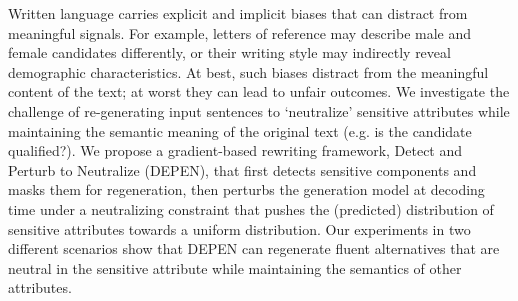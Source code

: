 Written language carries explicit and implicit biases that can distract from meaningful signals. For example, letters of reference may describe male and female candidates differently, or their writing style may indirectly reveal demographic characteristics. At best, such biases distract from the meaningful content of the text; at worst they can lead to unfair outcomes. We investigate the challenge of re-generating input sentences to ‘neutralize' sensitive attributes while maintaining the semantic meaning of the original text (e.g. is the candidate qualified?). We propose a gradient-based rewriting framework, Detect and Perturb to Neutralize (DEPEN), that first detects sensitive components and masks them for regeneration, then perturbs the generation model at decoding time under a neutralizing constraint that pushes the (predicted) distribution of sensitive attributes towards a uniform distribution. Our experiments in two different scenarios show that DEPEN can regenerate fluent alternatives that are neutral in the sensitive attribute while maintaining the semantics of other attributes.
